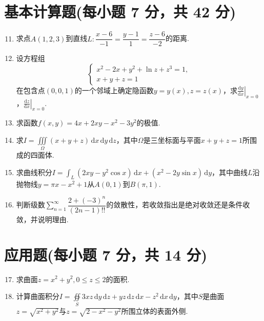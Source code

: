 \documentclass[../main.tex]{subfiles}
\begin{document}
\section{基本计算题(每小题 7 分，共 42 分)}
\begin{enumerate}
    \setcounter{enumi}{10}
    \item 求点$A(1,2,3)$到直线$L:\dfrac{x-6}{-1}=\dfrac{y-1}{1}=\dfrac{z-6}{-2}$的距离.
          \vspace{11em}

    \item 设方程组
          \[
              \begin{cases}
                  x^{2}-2x+y^{2}+\ln z+z^{3}=1, \\
                  x+y+z=1
              \end{cases}
          \]
          在包含点$(0,0,1)$的一个邻域上确定隐函数$y=y(x),z=z(x)$，求\( \left.\frac{\mathrm{d}y}{\mathrm{d}x}\right|_{x=0}\)，\(\left.\frac{\mathrm{d}z}{\mathrm{d}x}\right|_{x=0} \).
          \vspace{8em}

    \item 求函数$f(x,y)=4x+2xy-x^{2}-3y^{2}$的极值.
          \vspace{8em}

    \item 求$I=\iiint\limits_{\Omega}(x+y+z)\,\mathrm{d}x\,\mathrm{d}y\,\mathrm{d}z$，其中$\Omega$是三坐标面与平面$x+y+z=1$所围成的四面体.
          \vspace{9em}

    \item 求曲线积分$I=\int_{L}(2xy-y^{2}\cos x)\,\mathrm{d}x+(x^{2}-2y\sin x)\,\mathrm{d}y$，其中曲线$L$沿抛物线$y=\pi x-x^{2}+1$从$A(0,1)$到$B(\pi,1)$.
          \vspace{9em}

    \item 判断级数$\displaystyle\sum_{n=1}^{\infty}\dfrac{2+(-3)^{n}}{(2n-1)!!}$的敛散性，若收敛指出是绝对收敛还是条件收敛，并说明理由.
          \vspace{9em}
\end{enumerate}

\section{应用题(每小题 7 分，共 14 分)}
\begin{enumerate}
    \setcounter{enumi}{16}
    \item 求曲面$z=x^{2}+y^{2},0\leq z\leq2$的面积.
          \vspace{10em}

    \item 计算曲面积分$I=\oiint\limits_{S}3xz\,\mathrm{d}y\,\mathrm{d}z+yz\,\mathrm{d}z\,\mathrm{d}x-z^{2}\,\mathrm{d}x\,\mathrm{d}y$，其中$S$是曲面$z=\sqrt{x^{2}+y^{2}}$与$z=\sqrt{2-x^{2}-y^{2}}$所围立体的表面外侧.
          \vspace{10em}
\end{enumerate}
\end{document}
